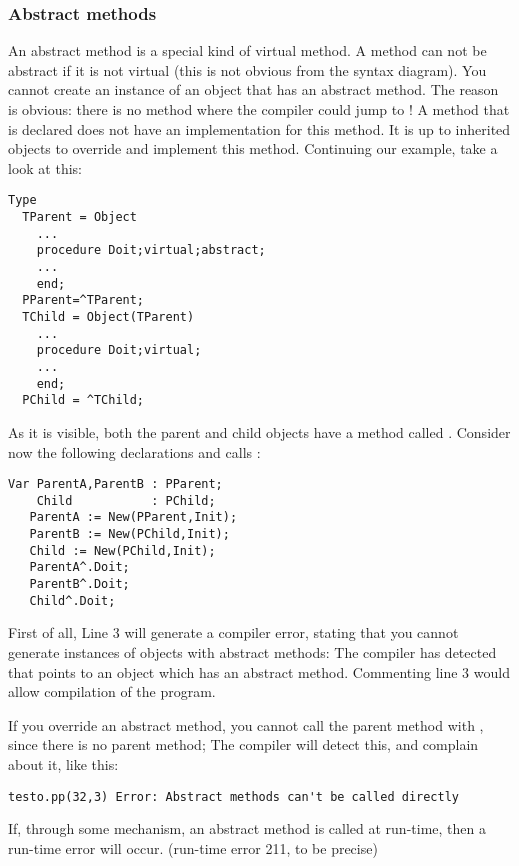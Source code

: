 \documentclass{report}
\begin{document}
\subsubsection{Abstract methods}
An abstract method is a special kind of virtual method. A method can not be
abstract if it is not virtual (this is not obvious from the syntax diagram).
You cannot create an instance of an object that has an abstract method.
The reason is obvious: there is no method where the compiler could jump to !
A method that is declared  does not have an implementation for
this method. It is up to inherited objects to override and implement this
method. Continuing our example, take a look at this:
\begin{verbatim}
Type
  TParent = Object
    ...
    procedure Doit;virtual;abstract;
    ...
    end;
  PParent=^TParent;
  TChild = Object(TParent)
    ...
    procedure Doit;virtual;
    ...
    end;
  PChild = ^TChild;
\end{verbatim}
As it is visible, both the parent and child objects have a method called
. Consider now the following declarations and calls :
\begin{verbatim}
Var ParentA,ParentB : PParent;
    Child           : PChild;
   ParentA := New(PParent,Init);
   ParentB := New(PChild,Init);
   Child := New(PChild,Init);
   ParentA^.Doit;
   ParentB^.Doit;
   Child^.Doit;
\end{verbatim}
First of all, Line 3 will generate a compiler error, stating that you cannot
generate instances of objects with abstract methods: The compiler has
detected that  points to an object which has an abstract
method. Commenting line 3 would allow compilation of the program.
\begin{remark}
If you override an abstract method, you cannot call the parent
method with , since there is no parent method; The compiler
will detect this, and complain about it, like this:
\begin{verbatim}
testo.pp(32,3) Error: Abstract methods can't be called directly
\end{verbatim}
If, through some mechanism, an abstract method is called at run-time,
then a run-time error will occur. (run-time error 211, to be precise)
\end{remark}

\end{document}
